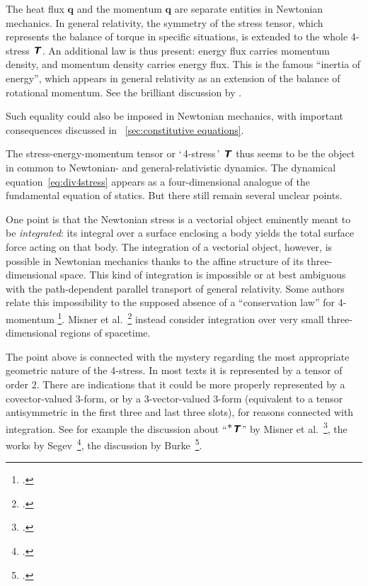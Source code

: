 \documentclass[\ifafour a4paper,12pt,\else a5paper,10pt,\fi%
onecolumn,oneside,article,%
british%
]{memoir}
\newcommand*{\defquote}[1]{`\,#1\,'}
\theoremstyle{remark}
\theoremstyle{innote}
\newcommand*{\mathte}[1]{\textbf{\textit{\textsf{#1}}}}
\newcommand*{\citep}{\footcites}
\renewcommand*{\|}[1][]{\nonscript\,#1\vert\nonscript\;\mathopen{}}
\newcommand*{\sect}{\S}%
\newcommand*{\chap}{ch.}%
\newcommand*{\etal}{{et al.}}
\newcommand*{\puzzle}{{\fontencoding{U}\fontfamily{fontawesometwo}\selectfont\symbol{225}}}
\newcommand*{\psect}{{\footnotesize\puzzle}}%
\newcommand*{\yqq}{q}
\newcommand*{\yq}{\bm{\yqq}}
\newcommand*{\yTTf}{T}
\newcommand*{\yTf}{\mathte{\yTTf}}
\begin{document}
The heat flux $\yq$ and the momentum $\yq$ are separate entities in
Newtonian mechanics. In general relativity, the symmetry of the stress
tensor, which represents the balance of torque in specific situations, is
extended to the whole 4-stress $\yTf$. An additional law is thus present:
energy flux carries momentum density, and momentum density carries energy
flux. This is the famous \enquote{inertia of energy}, which appears in
general relativity as an extension of the balance of rotational momentum.
See the brilliant discussion by \textcite[pp.~920--921, 923]{eckart1940c}.

Such equality could also be imposed in Newtonian mechanics, with important
consequences discussed in \psect~\ref{sec:constitutive equations}.

\medskip

The stress-energy-momentum tensor or \defquote{4-stress} $\yTf$ thus seems
to be the object in common to Newtonian- and general-relativistic dynamics.
The dynamical equation~\eqref{eq:div4stress} appears as a four-dimensional
analogue of the fundamental equation of statics. But there still remain
several unclear points.

One point is that the Newtonian stress is a vectorial object eminently
meant to be \emph{integrated}: its integral over a surface enclosing a body
yields the total surface force acting on that body. The integration of a
vectorial object, however, is possible in Newtonian mechanics thanks to the
affine structure of its three-dimensional space. This kind of integration
is impossible or at best ambiguous with the path-dependent parallel
transport of general relativity. Some authors relate this impossibility to
the supposed absence of a \enquote{conservation law} for 4-momentum
\citep[\sect~21]{pauli1921_t1958}[\sect~59]{eddington1923_r1930}[\sect~96]{landauetal1939_t1996}[also][]{aldermanetal1970}.
Misner \etal\ \citep[see their \chap~15, especially
\sect~15.3]{misneretal1970_r1973} instead consider integration over very
small three-dimensional regions of spacetime.

The point above is connected with the mystery regarding the most
appropriate geometric nature of the 4-stress. In most texts it is
represented by a tensor of order 2. There are indications that it could be
more properly represented by a covector-valued 3-form, or by a
3-vector-valued 3-form (equivalent to a tensor antisymmetric in the first
three and last three slots), for reasons connected with integration. See
for example the discussion about \enquote{$^{\displaystyle *}\mathte{T}$}
by Misner \etal~\citep[\chap~15]{misneretal1970_r1973}, the works by
Segev~\citep{segev2002,segev1986,segevetal1999,segev2000,segev2000b}, the
discussion by Burke~\citep[\sect~41]{burke1985_r1987}.
\end{document}
